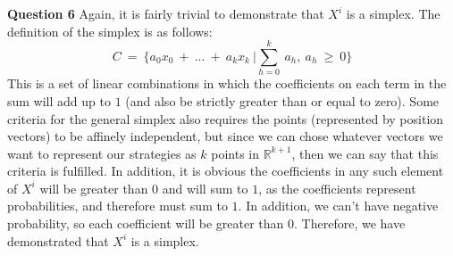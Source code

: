 \documentclass{article}
\begin{document}
\newline\newline
\textbf{Question 6}
\newline\newline
Again, it is fairly trivial to demonstrate that $X^i$ is a simplex. The definition of the simplex is as follows:
$$C \ = \ \Big\{ a_0x_0 \ + \ ... \ + \ a_kx_k \ \Big | \displaystyle\sum_{h=0}^{k} \ a_h, \ a_h \ \geq \ 0 \Big\}$$
This is a set of linear combinations in which the coefficients on each term in the sum will add up to $1$ (and also be strictly greater than or equal to zero). Some criteria for the general simplex also requires the points (represented by position vectors) to be affinely independent, but since we can chose whatever vectors we want to represent our strategies as $k$ points in $\mathbb{R}^{k+1}$, then we can say that this criteria is fulfilled. In addition, it is obvious the coefficients in any such element of $X^i$ will be greater than $0$ and will sum to $1$, as the coefficients represent probabilities, and therefore must sum to $1$. In addition, we can't have negative probability, so each coefficient will be greater than $0$. Therefore, we have demonstrated that $X^i$ is a simplex.
\end{document}
